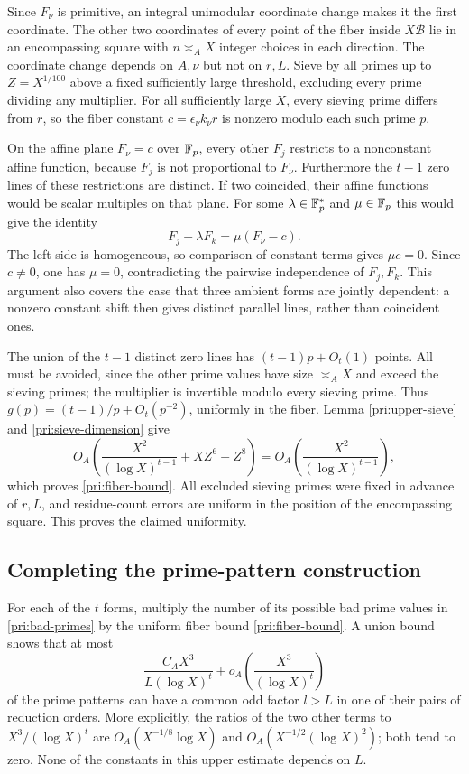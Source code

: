 Since $F_\nu$ is primitive, an integral unimodular coordinate change
makes it the first coordinate.  The other two coordinates of every
point of the fiber inside $X\mathcal B$ lie in an encompassing square
with $n\asymp_A X$ integer choices in each direction.  The coordinate
change depends on $A,\nu$ but not on $r,L$.
Sieve by all primes up to $Z=X^{1/100}$ above a fixed sufficiently
large threshold, excluding every prime dividing any multiplier.
For all sufficiently large $X$, every sieving prime differs from $r$,
so the fiber constant
$c=\epsilon_\nu k_\nu r$ is nonzero modulo each such prime $p$.

On the affine plane $F_\nu=c$ over $\mathbb F_p$, every other $F_j$ restricts
to a nonconstant affine function, because $F_j$ is not proportional to
$F_\nu$.  Furthermore the $t-1$ zero lines of these restrictions are
distinct.  If two coincided, their affine functions would be scalar
multiples on that plane.  For some $\lambda\in\mathbb F_p^*$ and
$\mu\in\mathbb F_p$ this would give the identity
\[
                         F_j-\lambda F_k=\mu(F_\nu-c).
\]
The left side is homogeneous, so comparison of constant terms gives
$\mu c=0$.  Since $c\ne0$, one has $\mu=0$, contradicting the pairwise
independence of $F_j,F_k$.  This argument also covers the case that
three ambient forms are jointly dependent: a nonzero constant shift
then gives distinct parallel lines, rather than coincident ones.

The union of the $t-1$ distinct zero lines has
$(t-1)p+O_t(1)$ points.  All must be avoided, since the other prime
values have size $\asymp_A X$ and exceed the sieving primes; the
multiplier is invertible modulo every sieving prime.  Thus
$g(p)=(t-1)/p+O_t(p^{-2})$, uniformly in the fiber.  Lemma
\ref{pri:upper-sieve} and \eqref{pri:sieve-dimension} give
\[
       O_A\!\left(\frac{X^2}{(\log X)^{t-1}}+XZ^6+Z^8\right)
                       =O_A\!\left(\frac{X^2}{(\log X)^{t-1}}\right),
\]
which proves \eqref{pri:fiber-bound}.  All excluded sieving primes were
fixed in advance of $r,L$, and residue-count errors are uniform in the
position of the encompassing square.  This proves the claimed
uniformity.

\subsection{Completing the prime-pattern construction}

For each of the $t$ forms, multiply the number of its possible bad prime
values in \eqref{pri:bad-primes} by the uniform fiber bound
\eqref{pri:fiber-bound}.  A union bound shows that at most
\begin{equation}\label{pri:total-loss}
          \frac{C_AX^3}{L(\log X)^t}
                         +o_A\!\left(\frac{X^3}{(\log X)^t}\right)
\end{equation}
of the prime patterns can have a common odd factor $l>L$ in one of
their pairs of reduction orders.  More explicitly, the ratios of the
two other terms to $X^3/(\log X)^t$ are
$O_A(X^{-1/8}\log X)$ and $O_A(X^{-1/2}(\log X)^2)$; both tend to
zero.  None of the constants in this upper estimate depends on $L$.


